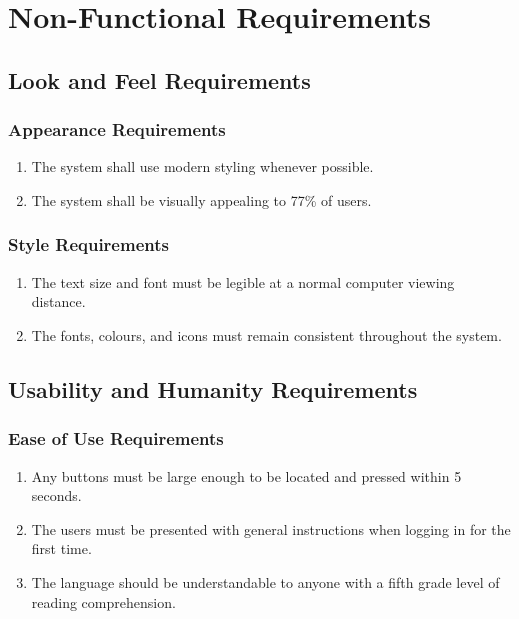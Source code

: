 \documentclass[]{article}
\begin{document}
	
	\section{Non-Functional Requirements}
	\label{sec:non-functional_requirements}
	\subsection{Look and Feel Requirements}
	\label{sub:look_and_feel_requirements}
	
	\subsubsection{Appearance Requirements}
	\label{ssub:appearance_requirements}
	\begin{enumerate}[{LF}1. ]
		\item The system shall use modern styling whenever possible.
		\item The system shall be visually appealing to 77\% of users.
	\end{enumerate}
	
	\subsubsection{Style Requirements}
	\label{ssub:style_requirements}
	\begin{enumerate}[{LF}1. ]
		\item The text size and font must be legible at a normal computer viewing distance.
		\item The fonts, colours, and icons must remain consistent throughout the system.
	\end{enumerate}
	
	
	\subsection{Usability and Humanity Requirements}
	\label{sub:usability_and_humanity_requirements}
	
	\subsubsection{Ease of Use Requirements}
	\label{ssub:ease_of_use_requirements}
	\begin{enumerate}[{UH}1. ]
		\item Any buttons must be large enough to be located and pressed within 5 seconds.
		\item The users must be presented with general instructions when logging in for the first time.
		\item The language should be understandable to anyone with a fifth grade level of reading comprehension.
	\end{enumerate}
	
\end{document}
